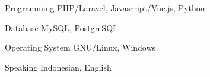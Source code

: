 


\begin{cvskills}


\cvskill
{Programming} %
{PHP/Laravel, Javascript/Vue.js, Python} %




\cvskill
{Database} %
{MySQL, PostgreSQL} %


\cvskill
{Operating System} %
{GNU/Linux, Windows} %


\cvskill
{Speaking} %
{Indonesian, English} %




\end{cvskills}
